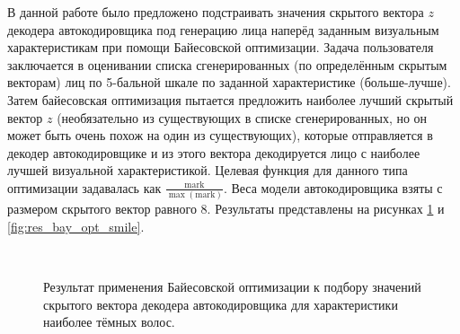 В данной работе было предложено подстраивать значения скрытого вектора $z$ декодера автокодировщика под генерацию лица наперёд заданным визуальным характеристикам при помощи Байесовской оптимизации. Задача пользователя заключается в оценивании списка сгенерированных (по определённым скрытым векторам) лиц по 5-бальной шкале по заданной характеристике (больше-лучше). Затем байесовская оптимизация пытается предложить наиболее лучший скрытый вектор $z$ (необязательно из существующих в списке сгенерированных, но он может быть очень похож на один из существующих), которые отправляется в декодер автокодировщике и из этого вектора декодируется лицо с наиболее лучшей визуальной характеристикой. Целевая функция для данного типа оптимизации задавалась как $\frac{\text{mark}}{\max(\text{mark})}$. Веса модели автокодировщика взяты с размером скрытого вектор равного 8. Результаты представлены на рисунках \ref{fig:res_bay_opt_hair} и \ref{fig:res_bay_opt_smile}.

\begin{figure}[H]
	\centering
	\captionsetup{justification=centering}
	 \\
	\caption{Результат применения Байесовской оптимизации к подбору значений скрытого вектора декодера автокодировщика для характеристики наиболее тёмных волос.}
	\label{fig:res_bay_opt_hair}
\end{figure}

